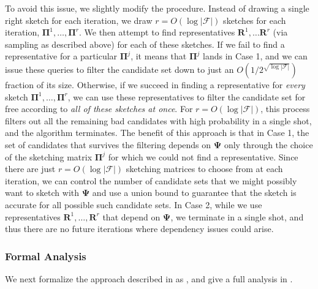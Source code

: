 \documentclass{article}[11pt]
\theoremstyle{definition}
\newcommand{\bv}[1]{\boldsymbol{\mathbf{#1}}}
\newcommand{\F}{\mathcal{F}}
\begin{document}
To avoid this issue, we slightly modify the procedure. Instead of drawing a single right sketch for each iteration, we draw $r = O(\log|\F|)$ sketches for each iteration, $\bv{\Pi}^{1}, \ldots, \bv{\Pi}^{r}$.
We then attempt to find representatives $\bv R^{1}, \ldots \bv R^{r}$ (via sampling as described above) for each of these sketches.
If we fail to find a representative for a particular $\bv{\Pi}^{j}$, it means that $\bv{\Pi}^{j}$ lands in Case 1, and we can issue these queries to filter the candidate set down to just an $O(1/2^{\sqrt{\log |\F|}})$ fraction of its size.
Otherwise, if we succeed in finding a representative for \emph{every} sketch $\bv{\Pi}^1,\ldots,\bv{\Pi}^{r}$, we can use these representatives to filter the candidate set for free according to \emph{all of these sketches at once}. 
For $r = O(\log|\F|)$, this process filters out all the remaining bad candidates with high probability in a single shot, and the algorithm terminates.
The benefit of this approach is that in Case 1, the set of candidates that survives the filtering depends on $\bv{\Psi}$ only through the choice of the sketching matrix $\bv{\Pi}^j$ for which we could not find a representative. Since there are just $r = O(\log|\F|)$ sketching matrices to choose from at each iteration, we can control the number of candidate sets that we might possibly want to sketch with $\bv{\Psi}$ and use a union bound to guarantee that the sketch is accurate for all possible such candidate sets. In Case 2, while we use representatives $\bv R^1,\ldots,\bv R^r$ that depend on $\bv \Psi$, we terminate in a single shot, and thus there are no future iterations where dependency issues could arise.

\subsubsection{Formal Analysis}\label{sec:formal}

We next formalize the approach described in  as , and give a full analysis in . 
\end{document}
